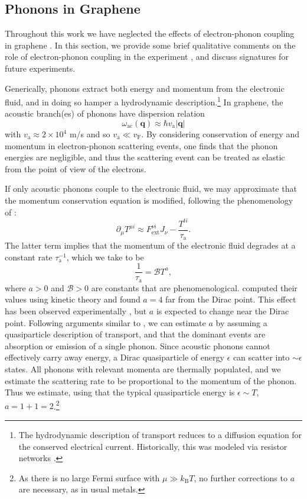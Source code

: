\documentclass[10pt, oneside]{book}
\begin{document}
\begin{doublespace}
\section{Phonons in Graphene}\label{secphonon}
Throughout this work we have neglected the effects of electron-phonon coupling in graphene \cite{fong, fong2}.   In this section, we provide some brief qualitative comments on the role of electron-phonon coupling in the experiment \cite{Crossno1058}, and discuss signatures for future experiments.

Generically, phonons extract both energy and momentum from the electronic fluid, and in doing so hamper a hydrodynamic description.\footnote{The hydrodynamic description of transport reduces to a diffusion equation for the conserved electrical current.   Historically, this was modeled via resistor networks \cite{kirkpatrick, derrida}.}  In graphene, the acoustic branch(es) of phonons have dispersion relation \cite{hwang07} \begin{equation}
\omega_{\mathrm{ac}}(\mathbf{q}) \approx \hbar v_{\mathrm{a}} |\mathbf{q}|
\end{equation} with  $v_{\mathrm{a}}\approx 2\times 10^4 $ m/s and so $v_{\mathrm{a}} \ll v_{\mathrm{F}}$.   By considering conservation of energy and momentum in electron-phonon scattering events, one finds that the phonon energies are negligible, and thus the scattering event can be treated as elastic from the point of view of the electrons.

If only acoustic phonons couple to the electronic fluid, we may approximate that the momentum conservation equation is modified, following the phenomenology of \cite{hkms}: \begin{equation}
\partial_\mu T^{\mu i} \approx F^{\nu i}_{\mathrm{ext}} J_\nu - \frac{T^{ti}}{\tau_{\mathrm{a}}} .
\end{equation}
The latter term implies that the momentum of the electronic fluid degrades at a constant rate $\tau^{-1}_{\mathrm{a}}$, which we take to be \begin{equation}
\frac{1}{\tau_{\mathrm{a}}} = \mathcal{B} T^a,
\end{equation}where $a>0$ and $\mathcal{B}>0$ are constants that are phenomenological.  \cite{hwang07} computed their values using kinetic theory and found $a=4$ far from the Dirac point.   This effect has been observed experimentally \cite{efetov},  but $a$ is expected to change near the Dirac point.   Following arguments similar to \cite{ashcroft, hwang07}, we can estimate $a$ by assuming a quasiparticle description of transport, and that the dominant events are absorption or emission of a single phonon.   Since acoustic phonons cannot effectively carry away energy, a Dirac quasiparticle of energy $\epsilon$ can scatter into $\sim \epsilon$ states.   All phonons with relevant momenta are thermally populated, and we estimate the scattering rate to be proportional to the momentum of the phonon.   Thus we estimate, using that the typical quasiparticle energy is $\epsilon \sim T$, $a=1+1=2$.\footnote{As there is no large Fermi surface with $\mu \gg k_{\mathrm{B}}T$, no further corrections to $a$ are necessary, as in usual metals.}


\end{doublespace}
\end{document}
